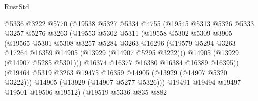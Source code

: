 \begin{lexlean}{RustStd}
\begin{coremodule}
                            @5336
                            @3222
                            @5770
                            (@19538
                              @5327
                              @5334
                              @4755
                              (@19545
                                @5313
                                @5326
                                @5333
                                @3257
                                @5276
                                @3263
                                (@19553
                                  @5302
                                  @5311
                                  (@19558
                                    @5302
                                    @5309
                                    @3905
                                    (@19565
                                      @5301
                                      @5308
                                      @3257
                                      @5284
                                      @3263
                                      @16296
                                      (@19579
                                        @5294
                                        @3263
                                        @17264
                                        @16359
                                        @14905
                                        (@13929 (@14907 @5295 @3222)))
                                      @14905
                                      (@13929 (@14907 @5285 @5301)))
                                    @16374
                                    @16377
                                    @16380
                                    @16384
                                    @16389
                                    @16395))
                                (@19464
                                  @5319
                                  @3263
                                  @19475
                                  @16359
                                  @14905
                                  (@13929 (@14907 @5320 @3222)))
                                @14905
                                (@13929 (@14907 @5277 @5326)))
                              @19491
                              @19494
                              @19497
                              @19501
                              @19506
                              @19512)
                            (@19519
                              @5336
                              @835
                              @882

\end{coremodule}
\end{lexlean}
